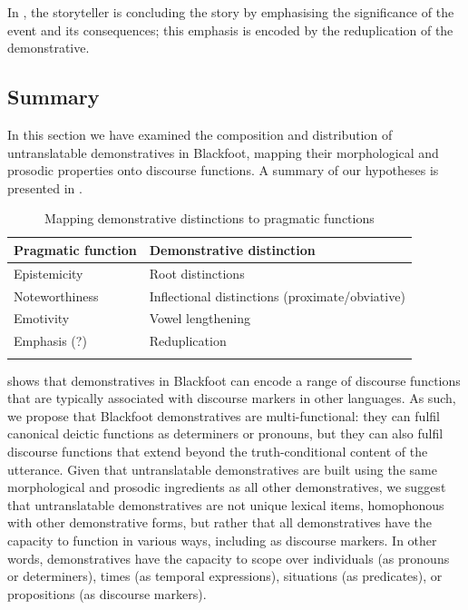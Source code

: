 \documentclass[output=paper,colorlinks,citecolor=brown]{langscibook}
\begin{document}
In , the storyteller is concluding the story by emphasising the significance of the event and its consequences; this emphasis is encoded by the reduplication of the demonstrative.

\subsection{Summary}\label{sec:bliss:4.5}

In this section we have examined the composition and distribution of untranslatable demonstratives in Blackfoot, mapping their morphological and prosodic properties onto discourse functions. A summary of our hypotheses is presented in .

\begin{table}
\begin{tabularx}{\textwidth}{lQ}
\lsptoprule
\textbf{Pragmatic function} & \textbf{Demonstrative distinction}\\
\midrule
Epistemicity & Root distinctions\\
Noteworthiness & Inflectional distinctions (proximate/obviative)\\
Emotivity & Vowel lengthening\\
Emphasis (?) & Reduplication\\
\lspbottomrule
\end{tabularx}
\caption{Mapping demonstrative distinctions to pragmatic functions}
\label{tab:bliss:3}
\end{table}

 shows that demonstratives in Blackfoot can encode a range of discourse functions that are typically associated with discourse markers in other languages. As such, we propose that Blackfoot demonstratives are multi-functional: they can fulfil canonical deictic functions as determiners or pronouns, but they can also fulfil discourse functions that extend beyond the truth-conditional content of the utterance. Given that untranslatable demonstratives are built using the same morphological and prosodic ingredients as all other demonstratives, we suggest that untranslatable demonstratives are not unique lexical items, homophonous with other demonstrative forms, but rather that all demonstratives have the capacity to function in various ways, including as discourse markers. In other words, demonstratives have the capacity to scope over individuals (as pronouns or determiners), times (as temporal expressions), situations (as predicates), or propositions (as discourse markers).
\end{document}
